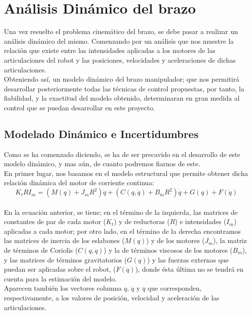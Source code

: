 \section{Análisis Dinámico del brazo}
Una vez resuelto el problema cinemático del brazo, se debe pasar a realizar un análisis dinámico del mismo. Comenzando por un análisis que nos muestre la relación que existe entre las intensidades aplicadas a los motores de las articulaciones del robot y las posiciones, velocidades y aceleraciones de dichas articulaciones.\\
Obteniendo así, un modelo dinámico del brazo manipulador; que nos permitirá desarrollar posteriormente todas las técnicas de control propuestas, por tanto, la fiabilidad, y la exactitud del modelo obtenido, determinaran en gran medida al control que se puedan desarrollar en este proyecto.


\subsection{Modelado Dinámico e Incertidumbres}
Como se ha comenzado diciendo, se ha de ser precavido en el desarrollo de este modelo dinámico, y mas aún, de cuanto podremos fiarnos de este.\\

En primer lugar, nos basamos en el modelo estructural que permite obtener dicha relación dinámica del motor de corriente continua:\\

	\begin{equation}
	K_tRI_m=(M(q)+J_mR^2)\ddot{q}+(C(q,\dot{q})+B_mR^2)\dot{q}+G(q)+F(\dot{q})
	\end{equation}\\

En la ecuación anterior, se tiene; en el término de la izquierda, las matrices de constantes de par de cada motor ($K_t$) y de reductoras ($R$) e intensidades ($I_m$) aplicadas a cada motor; por otro lado, en el término de la derecha encontramos las matrices de inercia de los eslabones ($M(q)$) y de los motores ($J_m$), la matriz de términos de Coriolis ($C(q,\dot{q})$) y la de términos viscosos de los motores ($B_m$), y las matrices de términos gravitatorios ($G(q)$) y las fuerzas externas que puedan ser aplicadas sobre el robot, ($F(\dot{q})$), donde ésta última no se tendrá en cuenta para la estimación del modelo.\\

Aparecen también los vectores columna $q$, $\dot{q}$ y $\ddot{q}$ que corresponden, respectivamente, a los valores de posición, velocidad y aceleración de las articulaciones.\\

